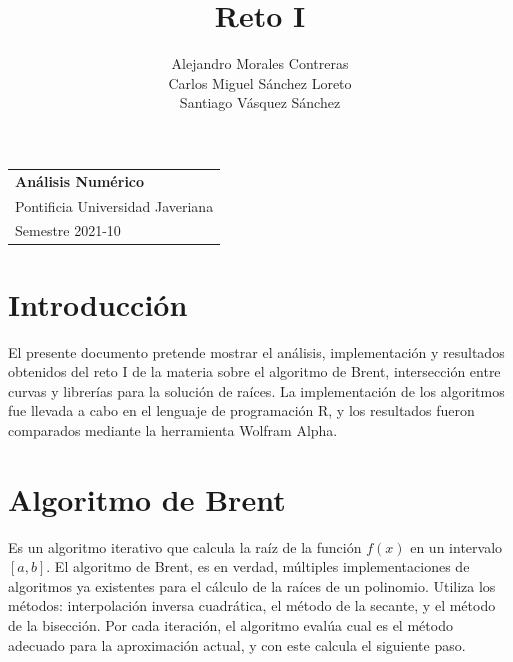 \documentclass[a4paper,12pt]{article}
\begin{document}
\thispagestyle{empty}

\begin{tabular}{p{14cm}}
{\large \bf Análisis Numérico} \\
Pontificia Universidad Javeriana \\ Semestre 2021-10 \\
\hline
\end{tabular}

\title{Reto I}
\author{Alejandro Morales Contreras \\ Carlos Miguel Sánchez Loreto \\ Santiago Vásquez Sánchez}
\date{}

\begingroup
\let\newpage\relax
\maketitle
\endgroup


\section{Introducción}


El presente documento pretende mostrar el análisis, implementación y resultados obtenidos del reto I de la materia sobre el algoritmo de Brent, intersección entre curvas y librerías para la solución de raíces. La implementación de los algoritmos fue llevada a cabo en el lenguaje de programación R, y los resultados fueron comparados mediante la herramienta Wolfram Alpha.


\section{Algoritmo de Brent}

Es un algoritmo iterativo que calcula la raíz de la función $f(x)$ en un intervalo $[a,b]$. El algoritmo de Brent, es en verdad, múltiples implementaciones de algoritmos ya existentes para el cálculo de la raíces de un polinomio. Utiliza los métodos: interpolación inversa cuadrática, el método de la secante, y el método de la bisección. Por cada iteración, el algoritmo evalúa cual es el método adecuado para la aproximación actual, y con este calcula el siguiente paso. \cite{fuente_oconnor_ingenierialgoritmos_2017} \par
\end{document}
